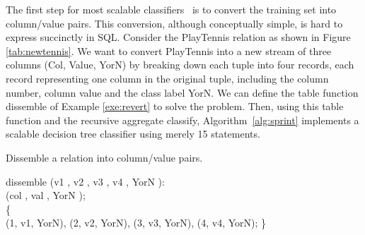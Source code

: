 The first step for most scalable classifiers~\cite{sprint} is to
convert the training set into column/value pairs. This conversion,
although conceptually simple, is hard to express succinctly in SQL.
Consider the {\bw PlayTennis} relation as shown in Figure \ref{tab:newtennis}. We want to convert {\bw PlayTennis} into a new
stream of three columns {\bw (Col, Value, YorN)} by breaking down each
tuple into four records, each record representing one column in the
original tuple, including the column number, column value and the
class label {\bw YorN}.  We can define the table function
{\bw dissemble} of Example \ref{exe:revert} to solve the problem.
Then, using this table function and the recursive aggregate {\bw
classify}, Algorithm~\ref{alg:sprint} implements a
scalable decision tree classifier using
merely 15 statements.
\begin{example}{Dissemble a relation into column/value pairs.}

\begin{codedisplay}
 dissemble (v1 , v2 , v3 ,
v4 , YorN ):\\
\>\>\>\>\>\>\>\>(col , val , YorN ); \\[0.2cm]
 \{\>    \\
 \>\>\>(1, v1, YorN), (2, v2, YorN), \kw{}(3, v3, YorN), (4, v4, YorN);
\}
\end{codedisplay}
 \vspace*{-0.2cm}
\label{exe:revert}
\end{example}

